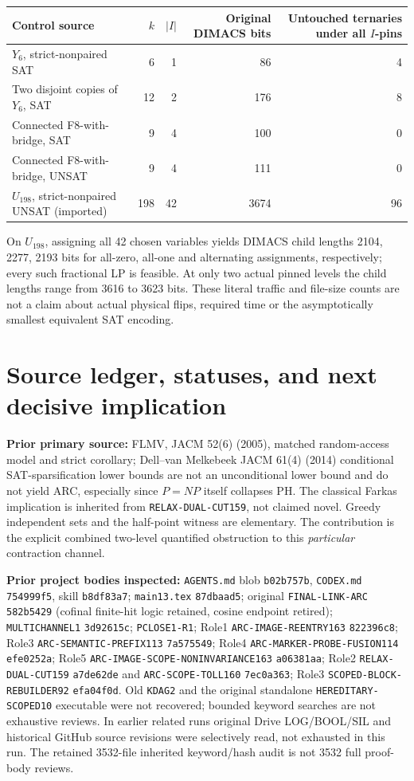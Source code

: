 \documentclass[11pt]{article}
\begin{document}
\begin{center}\small
\begin{tabular}{lrrrr}
\toprule
Control source & \(k\) & \(|I|\) & Original DIMACS bits &
 Untouched ternaries under all \(I\)-pins\\\midrule
\(Y_6\), strict-nonpaired SAT &6&1&86&4\\
Two disjoint copies of \(Y_6\), SAT &12&2&176&8\\
Connected F8-with-bridge, SAT &9&4&100&0\\
Connected F8-with-bridge, UNSAT &9&4&111&0\\
\(U_{198}\), strict-nonpaired UNSAT (imported) &198&42&3674&96\\
\bottomrule
\end{tabular}
\end{center}
On \(U_{198}\), assigning all 42 chosen variables yields
DIMACS child lengths 2104, 2277, 2193 bits for all-zero,
all-one and alternating assignments, respectively;
every such fractional LP is feasible. At only two actual
pinned levels the child lengths range from 3616 to 3623
bits. These literal traffic and file-size counts are not
a claim about actual physical flips, required time or
the asymptotically smallest equivalent SAT encoding.

\section{Source ledger, statuses, and next decisive implication}
\textbf{Prior primary source:} FLMV, JACM 52(6) (2005), matched
random-access model and strict corollary; Dell--van Melkebeek
JACM 61(4) (2014) conditional SAT-sparsification lower bounds
are not an unconditional lower bound and do not yield ARC,
especially since \(P=NP\) itself collapses PH.
The classical Farkas implication is inherited from
\texttt{RELAX-DUAL-CUT159}, not claimed novel.
Greedy independent sets and the half-point witness are elementary.
The contribution is the explicit combined two-level quantified
obstruction to this \emph{particular} contraction channel.

\textbf{Prior project bodies inspected:}
\texttt{AGENTS.md} blob \texttt{b02b757b},
\texttt{CODEX.md} \texttt{754999f5},
skill \texttt{b8df83a7};
\texttt{main13.tex} \texttt{87dbaad5};
original \texttt{FINAL-LINK-ARC} \texttt{582b5429}
(cofinal finite-hit logic retained, cosine endpoint retired);
\texttt{MULTICHANNEL1} \texttt{3d92615c};
\texttt{PCLOSE1-R1};
Role1 \texttt{ARC-IMAGE-REENTRY163} \texttt{822396c8};
Role3 \texttt{ARC-SEMANTIC-PREFIX113} \texttt{7a575549};
Role4 \texttt{ARC-MARKER-PROBE-FUSION114} \texttt{efe0252a};
Role5 \texttt{ARC-IMAGE-SCOPE-NONINVARIANCE163}
\texttt{a06381aa};
Role2 \texttt{RELAX-DUAL-CUT159} \texttt{a7de62de}
and \texttt{ARC-SCOPE-TOLL160} \texttt{7ec0a363};
Role3 \texttt{SCOPED-BLOCK-REBUILDER92}
\texttt{efa04f0d}.
Old \texttt{KDAG2} and the original standalone
\texttt{HEREDITARY-SCOPED10} executable were not recovered;
bounded keyword searches are not exhaustive reviews.
In earlier related runs original Drive LOG/BOOL/SIL
and historical GitHub source revisions were selectively read,
not exhausted in this run. The retained 3532-file inherited
keyword/hash audit is not 3532 full proof-body reviews.
\end{document}
